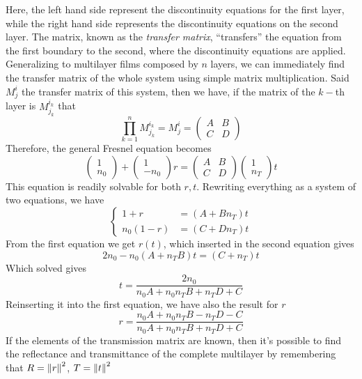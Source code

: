 \documentclass[../electromagnetism.tex]{subfiles}
\begin{document}
Here, the left hand side represent the discontinuity equations for the first layer, while the right hand side represents the discontinuity equations on the second layer. The matrix, known as the \textit{transfer matrix}, ``transfers'' the equation from the first boundary to the second, where the discontinuity equations are applied.\\
Generalizing to multilayer films composed by $n$ layers, we can immediately find the transfer matrix of the whole system using simple matrix multiplication. Said $M^i_j$ the transfer matrix of this system, then we have, if the matrix of the $k-$th layer is $M^{i_k}_{j_k}$ that
\begin{equation}
	\prod_{k=1}^nM^{i_k}_{j_k}=M^i_j=\begin{pmatrix}
		A&B\\C&D
	\end{pmatrix}
	\label{eq:generalmultilayermatrix.mlt}
\end{equation}
Therefore, the general Fresnel equation becomes
\begin{equation}
	\begin{pmatrix}
		1\\n_0
	\end{pmatrix}+\begin{pmatrix}
		1\\-n_0
	\end{pmatrix}r=\begin{pmatrix}
		A&B\\C&D
	\end{pmatrix}\begin{pmatrix}
		1\\n_T
	\end{pmatrix}t
	\label{eq:generalfreq.mlt}
\end{equation}
This equation is readily solvable for both $r, t$. Rewriting everything as a system of two equations, we have
\begin{equation*}
	\left\{\begin{aligned}
		1+r&= \left( A+Bn_T \right)t\\
		n_0(1-r)&= \left( C+Dn_T \right)t
	\end{aligned}\right.
\end{equation*}
From the first equation we get $r(t)$, which inserted in the second equation gives
\begin{equation*}
	2n_0-n_0\left( A+n_TB \right)t=(C+n_T)t
\end{equation*}
Which solved gives
\begin{equation}
	t=\frac{2n_0}{n_0A+n_0n_TB+n_TD+C}
	\label{eq:tcoeff.mlt}
\end{equation}
Reinserting it into the first equation, we have also the result for $r$
\begin{equation}
	r=\frac{n_0A+n_0n_TB-n_TD-C}{n_0A+n_0n_TB+n_TD+C}
	\label{eq:rcoeff.mlt}
\end{equation}
If the elements of the transmission matrix are known, then it's possible to find the reflectance and transmittance of the complete multilayer by remembering that $R=\norm{r}^2$, $T=\norm{t}^2$
\end{document}
